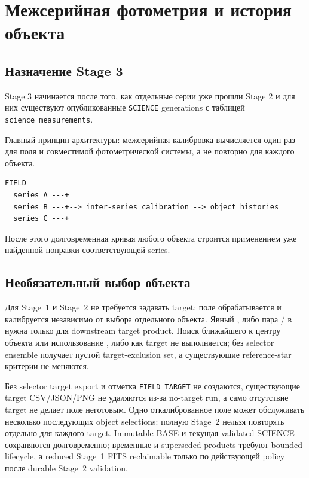 \chapter{Межсерийная фотометрия и история объекта}

\section{Назначение Stage 3}

Stage 3 начинается после того, как отдельные серии уже прошли Stage 2 и для них существуют опубликованные \texttt{SCIENCE} generations с таблицей \texttt{science\_measurements}.

Главный принцип архитектуры: межсерийная калибровка вычисляется один раз для поля и совместимой фотометрической системы, а не повторно для каждого объекта.

\begin{lstlisting}
FIELD
  series A ---+
  series B ---+--> inter-series calibration --> object histories
  series C ---+
\end{lstlisting}

После этого долговременная кривая любого объекта строится применением уже найденной поправки соответствующей series.

\section{Необязательный выбор объекта}

Для Stage~1 и Stage~2 не требуется задавать target: поле обрабатывается и калибруется независимо от выбора отдельного объекта. Явный ,  либо пара / в  нужна только для downstream target product. Поиск ближайшего к центру объекта или использование ,  либо  как target не выполняется; без selector ensemble получает пустой target-exclusion set, а существующие reference-star критерии не меняются.

Без selector target export и отметка \texttt{FIELD\_TARGET} не создаются, существующие target CSV/JSON/PNG не удаляются из-за no-target run, а само отсутствие target не делает поле неготовым. Одно откалиброванное поле может обслуживать несколько последующих object selections: полную Stage~2 нельзя повторять отдельно для каждого target. Immutable BASE и текущая validated SCIENCE сохраняются долговременно; временные и superseded products требуют bounded lifecycle, а reduced Stage~1 FITS reclaimable только по действующей policy после durable Stage~2 validation.

